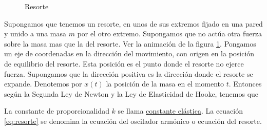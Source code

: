 \begin{figure}[h]
 \begin{center}
 \caption{Resorte}\label{fig:resortito}
 \end{center}
 \end{figure}

 Supongamos que tenemos un resorte, en unos de sus extremos fijado en una pared y unido a una masa $m$ por el otro extremo. Supongamos que no actúa otra fuerza
 sobre la masa mas que la del resorte. Ver la animación de la figura \ref{fig:resortito}.  Pongamos un eje de coordenadas en la dirección del movimiento, con origen en la posición de equilibrio
 del resorte. Esta posición es el punto donde el resorte no ejerce fuerza. Supongamos que la dirección positiva es la dirección donde el resorte se expande. Denotemos
 por $x(t)$ la posición de la masa en el momento $t$.    Entonces según la Segunda Ley de Newton y la Ley de Elasticidad de Hooke, tenemos que


La constante de proporcionalidad $k$ se llama \href{http://es.wikipedia.org/wiki/Rigidez}{constante elástica}\link. La ecuación \eqref{eq:resorte} se denomina la
ecuación del oscilador armónico o ecuación del resorte.

